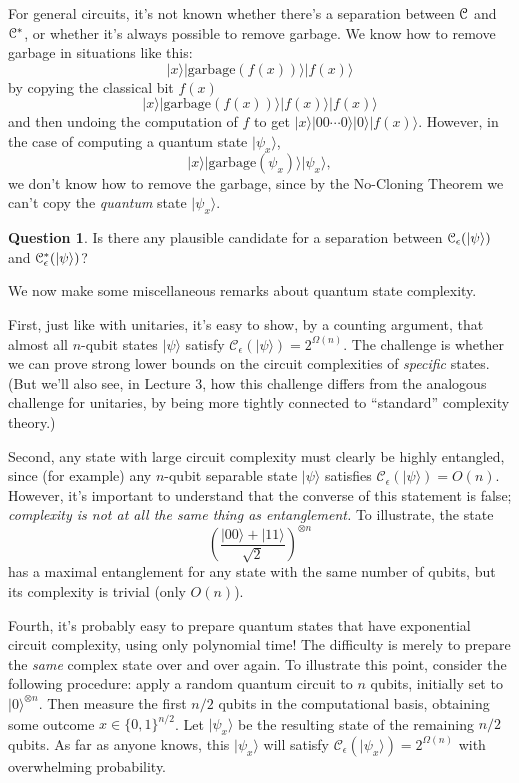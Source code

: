 \documentclass[12pt]{report}
\theoremstyle{plain}
\theoremstyle{definition}
\newtheorem{question}[theorem]{Question}
\renewcommand{\ket}[1]{|#1\rangle}
\begin{document}
For general circuits, it's not known whether there's a separation between $\cal C$ and $\cal C^*$, or whether it's always possible to remove garbage.  We know how to remove garbage in situations like this:
\[
 \ket{x}\ket{\mathrm{garbage}(f(x))}\ket{f(x)}
\]
by copying the classical bit $f(x)$
\[
 \ket{x}\ket{\mathrm{garbage}(f(x))}\ket{f(x)}\ket{f(x)}
\]
and then undoing the computation of $f$ to get $\ket{x}\ket{00 \cdots 0}\ket{0}\ket{f(x)}$.
However, in the case of computing a quantum state $\ket{\psi_x}$,
\[
 \ket{x}\ket{\mathrm{garbage}(\psi_x)}\ket{\psi_x},
\]
we don't know how to remove the garbage, since by the No-Cloning Theorem we can't copy the {\em quantum} state $\ket{\psi_x}$.

\begin{question}
Is there any plausible candidate for a separation between $\cal C_{\epsilon}(\ket{\psi})$ and $\cal C^*_{\epsilon}(\ket{\psi})$?
\end{question}

We now make some miscellaneous remarks about quantum state complexity.

First, just like with unitaries, it's easy to show, by a counting argument, that almost all $n$-qubit states $\ket{\psi}$ satisfy $\mathcal{C}_{\epsilon}(\ket{\psi}) = 2^{\Omega(n)}$.  The challenge is whether we can prove strong lower bounds on the circuit complexities of {\em specific} states.  (But we'll also see, in Lecture 3, how this challenge differs from the analogous challenge for unitaries, by being more tightly connected to ``standard'' complexity theory.)

Second, any state with large circuit complexity must clearly be highly entangled, since (for example) any $n$-qubit separable state $\ket{\psi}$ satisfies $\mathcal{C}_{\epsilon}(\ket{\psi}) = O(n)$.  However, it's important to understand that the converse of this statement is false; {\em complexity is not at all the same thing as entanglement.}  To illustrate, the state
\[
\left(\frac{\ket{00}+\ket{11}}{\sqrt 2}\right)^{\otimes n}
\]
has a maximal entanglement for any state with the same number of qubits, but its complexity is trivial (only $O(n)$).

Fourth, it's probably easy to prepare quantum states that have exponential circuit complexity, using only polynomial time!  The difficulty is merely to prepare the {\em same} complex state over and over again.  To illustrate this point, consider the following procedure: apply a random quantum circuit to $n$ qubits, initially set to $\ket{0}^{\otimes n}$. Then measure
the first $n/2$ qubits in the computational basis, obtaining some outcome $x\in \{0,1\}^{n/2}$.  Let $\ket{\psi_x}$ be the resulting state of the remaining $n/2$ qubits.  As far as anyone knows, this $\ket{\psi_x}$ will satisfy $\mathcal{C}_{\epsilon}(\ket{\psi_x}) = 2^{\Omega(n)}$ with overwhelming probability.
\end{document}
